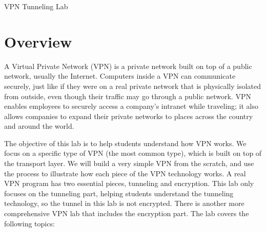 




\newcommand{\miniVPN}{{\tt MiniVPN}\xspace}
\newcommand{\vpnFigs}{./Figs}



\newcommand{\hostu}{{\tt U}\xspace}
\newcommand{\hostv}{{\tt V}\xspace}




\begin{center}
{\LARGE VPN Tunneling Lab}
\end{center}


\setcounter{task}{1}
\newcommand{\tasks} {\bf {\noindent (\arabic{task})} \addtocounter{task}{1} \,}

\section{Overview}

A Virtual Private Network (VPN) is a private network built on top of a
public network, usually the Internet. Computers inside a VPN can
communicate securely, just like if they were on a real private network that
is physically isolated from outside, even though their traffic may go
through a public network. VPN enables employees to securely access a
company's intranet while traveling; it also allows companies to expand
their private networks to places across the country and around the world.


The objective of this lab is to help students understand how 
VPN works. We focus on a specific type
of VPN (the most common type), which is built on top of the transport layer.
We will build a very simple VPN from the scratch, and use the process to 
illustrate how each piece of the VPN technology works. A real VPN 
program has two essential pieces, tunneling and encryption. This lab only 
focuses on the tunneling part, helping students understand the tunneling 
technology, so the tunnel in this lab is not encrypted. 
There is another more comprehensive VPN lab that includes the encryption part.
The lab covers the following topics:  

